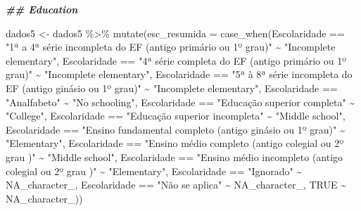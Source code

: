 \documentclass[
]{article}
\newenvironment{Shaded}{\begin{snugshade}}{\end{snugshade}}
\newcommand{\AttributeTok}[1]{\textcolor[rgb]{0.77,0.63,0.00}{#1}}
\newcommand{\ConstantTok}[1]{\textcolor[rgb]{0.00,0.00,0.00}{#1}}
\newcommand{\DocumentationTok}[1]{\textcolor[rgb]{0.56,0.35,0.01}{\textbf{\textit{#1}}}}
\newcommand{\FunctionTok}[1]{\textcolor[rgb]{0.00,0.00,0.00}{#1}}
\newcommand{\NormalTok}[1]{#1}
\newcommand{\OtherTok}[1]{\textcolor[rgb]{0.56,0.35,0.01}{#1}}
\newcommand{\SpecialCharTok}[1]{\textcolor[rgb]{0.00,0.00,0.00}{#1}}
\newcommand{\StringTok}[1]{\textcolor[rgb]{0.31,0.60,0.02}{#1}}
\begin{document}
\begin{Shaded}
\begin{Highlighting}[]
\DocumentationTok{\#\# Education}

\NormalTok{dados5 }\OtherTok{\textless{}{-}}\NormalTok{  dados5 }\SpecialCharTok{\%\textgreater{}\%}
  \FunctionTok{mutate}\NormalTok{(}\AttributeTok{esc\_resumida =} \FunctionTok{case\_when}\NormalTok{(Escolaridade }\SpecialCharTok{==} \StringTok{"1ª a 4ª série incompleta do EF (antigo primário ou 1º grau)"} \SpecialCharTok{\textasciitilde{}} \StringTok{"Incomplete elementary"}\NormalTok{, }
\NormalTok{                        Escolaridade }\SpecialCharTok{==} \StringTok{"4ª série completa do EF (antigo primário ou 1º grau)"} \SpecialCharTok{\textasciitilde{}} \StringTok{"Incomplete elementary"}\NormalTok{,}
\NormalTok{                        Escolaridade }\SpecialCharTok{==} \StringTok{"5ª à 8ª série incompleta do EF (antigo ginásio ou 1º grau)"} \SpecialCharTok{\textasciitilde{}} \StringTok{"Incomplete elementary"}\NormalTok{,}
\NormalTok{                        Escolaridade }\SpecialCharTok{==} \StringTok{"Analfabeto"} \SpecialCharTok{\textasciitilde{}} \StringTok{"No schooling"}\NormalTok{,}
\NormalTok{                        Escolaridade }\SpecialCharTok{==} \StringTok{"Educação superior completa"} \SpecialCharTok{\textasciitilde{}} \StringTok{"College"}\NormalTok{,}
\NormalTok{                        Escolaridade }\SpecialCharTok{==} \StringTok{"Educação superior incompleta"} \SpecialCharTok{\textasciitilde{}} \StringTok{"Middle school"}\NormalTok{,}
\NormalTok{                        Escolaridade }\SpecialCharTok{==} \StringTok{"Ensino fundamental completo (antigo ginásio ou 1º grau)"} \SpecialCharTok{\textasciitilde{}} \StringTok{"Elementary"}\NormalTok{,}
\NormalTok{                        Escolaridade }\SpecialCharTok{==} \StringTok{"Ensino médio completo (antigo colegial ou 2º grau )"} \SpecialCharTok{\textasciitilde{}} \StringTok{"Middle school"}\NormalTok{,}
\NormalTok{                        Escolaridade }\SpecialCharTok{==} \StringTok{"Ensino médio incompleto (antigo colegial ou 2º grau )"} \SpecialCharTok{\textasciitilde{}} \StringTok{"Elementary"}\NormalTok{,}
\NormalTok{                        Escolaridade }\SpecialCharTok{==} \StringTok{"Ignorado"} \SpecialCharTok{\textasciitilde{}} \ConstantTok{NA\_character\_}\NormalTok{,}
\NormalTok{                        Escolaridade }\SpecialCharTok{==} \StringTok{"Não se aplica"} \SpecialCharTok{\textasciitilde{}} \ConstantTok{NA\_character\_}\NormalTok{,}
                               \ConstantTok{TRUE} \SpecialCharTok{\textasciitilde{}} \ConstantTok{NA\_character\_}\NormalTok{))}


\end{Highlighting}
\end{Shaded}
\end{document}

